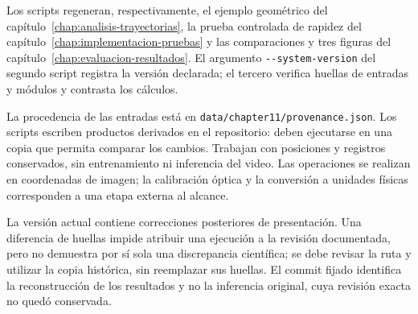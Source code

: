 Los scripts regeneran, respectivamente, el ejemplo geométrico del capítulo~\ref{chap:analisis-trayectorias}, la prueba controlada de rapidez del capítulo~\ref{chap:implementacion-pruebas} y las comparaciones y tres figuras del capítulo~\ref{chap:evaluacion-resultados}. El argumento \verb|--system-version| del segundo script registra la versión declarada; el tercero verifica huellas de entradas y módulos y contrasta los cálculos.

La procedencia de las entradas está en \nolinkurl{data/chapter11/provenance.json}. Los scripts escriben productos derivados en el repositorio: deben ejecutarse en una copia que permita comparar los cambios. Trabajan con posiciones y registros conservados, sin entrenamiento ni inferencia del video. Las operaciones se realizan en coordenadas de imagen; la calibración óptica y la conversión a unidades físicas corresponden a una etapa externa al alcance.

La versión actual contiene correcciones posteriores de presentación. Una diferencia de huellas impide atribuir una ejecución a la revisión documentada, pero no demuestra por sí sola una discrepancia científica; se debe revisar la ruta y utilizar la copia histórica, sin reemplazar sus huellas. El commit fijado identifica la reconstrucción de los resultados y no la inferencia original, cuya revisión exacta no quedó conservada.
